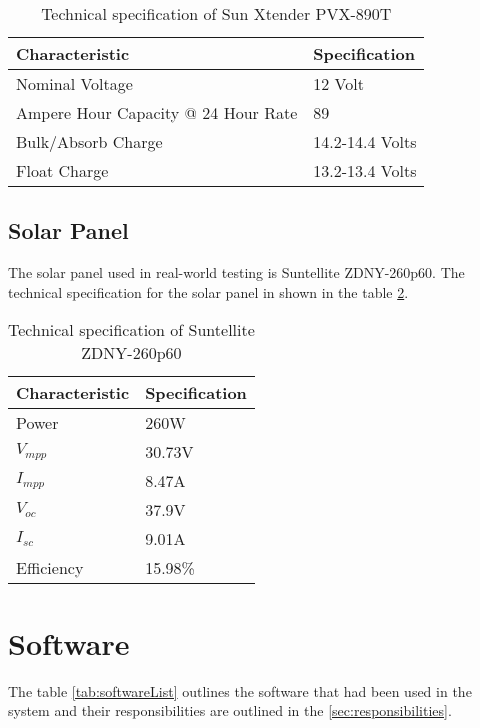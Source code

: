 \documentclass[../thesis.tex]{subfiles}
\begin{document}
\begin{table}[h!]
\begin{center}
\caption{Technical specification of Sun Xtender PVX-890T}
\label{tab:pvx890t}
\begin{tabular}{l|l}
\toprule
\textbf{Characteristic} & \textbf{Specification}\\
\midrule
Nominal Voltage & 12 Volt\\
Ampere Hour Capacity @ 24 Hour Rate & 89\\
Bulk/Absorb Charge & 14.2-14.4 Volts\\
Float Charge & 13.2-13.4 Volts\\
\bottomrule
\end{tabular}
\end{center}
\end{table}

\subsection{Solar Panel}

The solar panel used in real-world testing is Suntellite ZDNY-260p60. The technical specification for the solar panel in shown in the table \ref{tab:solarpanel}.

\begin{table}[h!]
\begin{center}
\caption{Technical specification of Suntellite ZDNY-260p60}
\label{tab:solarpanel}
\begin{tabular}{l|l}
\toprule
\textbf{Characteristic} & \textbf{Specification}\\
\midrule
Power & 260W\\
$V_{mpp}$ & 30.73V\\
$I_{mpp}$ & 8.47A\\
$V_{oc}$ & 37.9V\\
$I_{sc}$& 9.01A\\
Efficiency& 15.98\%\\
\bottomrule
\end{tabular}
\end{center}
\end{table}


\section{Software}
\label{sec:software}

The table \ref{tab:softwareList} outlines the software that had been used in the system and their responsibilities are outlined in the \autoref{sec:responsibilities}.
\end{document}
